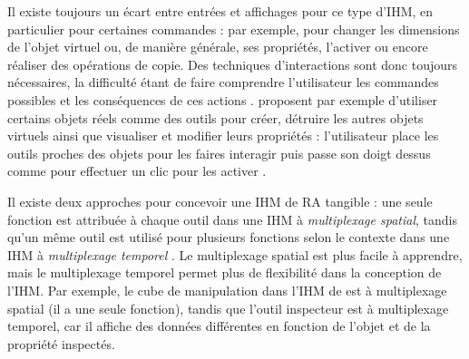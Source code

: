
Il existe toujours un écart entre entrées et affichages pour ce type d'IHM, en particulier pour certaines commandes : par exemple, pour changer les dimensions de l'objet virtuel ou, de manière générale, ses propriétés, l'activer ou encore réaliser des opérations de copie. Des techniques d'interactions sont donc toujours nécessaires, la difficulté étant de faire comprendre l'utilisateur les commandes possibles et les conséquences de ces actions \citep{Zhou2008}. \cite{Lee2004} proposent par exemple d'utiliser certains objets réels comme des outils pour créer, détruire les autres objets virtuels ainsi que visualiser et modifier leurs propriétés : l'utilisateur place les outils proches des objets pour les faires interagir puis passe son doigt dessus comme pour effectuer un clic pour les activer .

Il existe deux approches pour concevoir une IHM de RA tangible : une seule fonction est attribuée à chaque outil dans une IHM à \emph{multiplexage spatial}, tandis qu'un même outil est utilisé pour plusieurs fonctions selon le contexte dans une IHM à \emph{multiplexage temporel} \cite[p. 171]{Billinghurst2015}. Le multiplexage spatial est plus facile à apprendre, mais le multiplexage temporel permet plus de flexibilité dans la conception de l'IHM. Par exemple, le cube de manipulation dans l'IHM de \cite{Lee2004} est à multiplexage spatial (il a une seule fonction), tandis que l'outil inspecteur est à multiplexage temporel, car il affiche des données différentes en fonction de l'objet et de la propriété inspectés.


